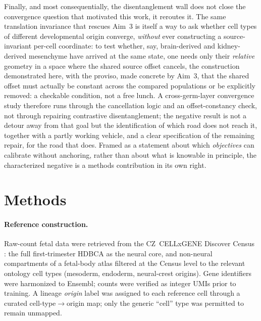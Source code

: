\documentclass[11pt]{article}
\begin{document}
Finally, and most consequentially, the disentanglement wall does not close the convergence question that
motivated this work, it reroutes it. The same translation invariance that rescues Aim~3 is itself a way
to ask whether cell types of different developmental origin converge, \emph{without} ever constructing a
source-invariant per-cell coordinate: to test whether, say, brain-derived and kidney-derived mesenchyme
have arrived at the same state, one needs only their \emph{relative} geometry in a space where the shared
source offset cancels, the construction demonstrated here, with the proviso, made concrete by Aim~3,
that the shared offset must actually be constant across the compared populations or be explicitly
removed: a checkable condition, not a free lunch. A cross-germ-layer convergence study therefore runs
through the cancellation logic and an offset-constancy check, not through repairing contrastive
disentanglement; the negative result is not a detour away from that goal but the identification of which
road does not reach it, together with a partly working vehicle, and a clear specification of the
remaining repair, for the road that does. Framed as a statement about which
\emph{objectives} can calibrate without anchoring, rather than about what is knowable in principle, the
characterized negative is a methods contribution in its own right.

\section{Methods}
\paragraph{Reference construction.} Raw-count fetal data were retrieved from the CZ~CELLxGENE Discover
Census \citep{czi2025cellxgene}: the full first-trimester HDBCA \citep{braun2023hdbca} as the neural
core, and non-neural compartments of a fetal-body atlas \citep{cao2020fetal} filtered at the
Census level to the relevant ontology cell types (mesoderm, endoderm, neural-crest origins). Gene
identifiers were harmonized to Ensembl; counts were verified as integer UMIs prior to training. A
lineage \emph{origin} label was assigned to each reference cell through a curated cell-type$\rightarrow$origin
map; only the generic ``cell'' type was permitted to remain unmapped.
\end{document}
